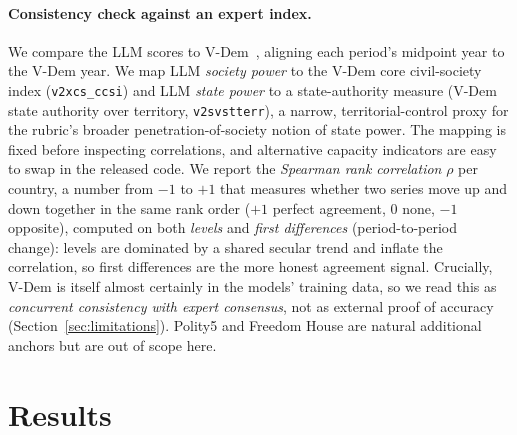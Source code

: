 \documentclass[twocolumn,10pt]{article}
\begin{document}
\paragraph{Consistency check against an expert index.} We compare the LLM scores
to V-Dem~\citep{coppedge2024vdem}, aligning each period's midpoint year to the
V-Dem year. We map LLM \emph{society power} to the V-Dem core civil-society index
(\texttt{v2xcs\_ccsi}) and LLM \emph{state power} to a state-authority measure
(V-Dem state authority over territory, \texttt{v2svstterr}), a narrow,
territorial-control proxy for the rubric's broader penetration-of-society notion
of state power. The mapping is fixed before inspecting correlations, and
alternative capacity indicators are easy to swap in the released code. We report
the \emph{Spearman rank correlation} $\rho$ per country, a number from $-1$ to
$+1$ that measures whether two series move up and down together in the same
rank order ($+1$ perfect agreement, $0$ none, $-1$ opposite), computed on both
\emph{levels} and \emph{first differences} (period-to-period change): levels are
dominated by a shared secular trend and inflate the correlation, so first
differences are the more honest agreement signal. Crucially, V-Dem is
itself almost certainly in the models' training data, so we read this as
\emph{concurrent consistency with expert consensus}, not as external proof of
accuracy (Section~\ref{sec:limitations}). Polity5 and Freedom House are natural
additional anchors but are out of scope here.

\section{Results}
\label{sec:results}
\end{document}
